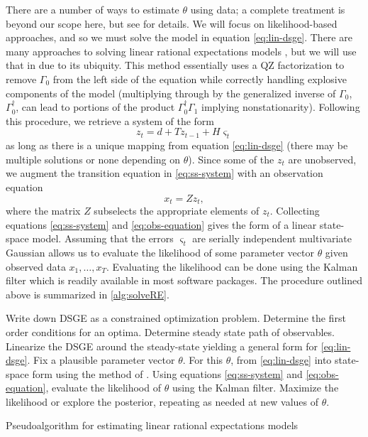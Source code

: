 \documentclass[11pt]{article}
\begin{document}
There are a number of ways to estimate \(\theta\) using data; a complete
treatment is beyond our scope here, but see \citet{DeJongDave2007} for
details. We will focus on likelihood-based approaches, and so we must
solve the model in equation \eqref{eq:lin-dsge}. There are many
approaches to solving linear rational expectations models
\citep[e.g.][]{BlanchardKahn1980,Klein2000}, but we will use that in
\citet{Sims2002} due to its ubiquity. This method essentially uses a QZ
factorization to remove \(\Gamma_0\) from the left side of the equation
while correctly handling explosive components of the model (multiplying
through by the generalized inverse of \(\Gamma_0\),
\(\Gamma_0^\dagger\), can lead to portions of the product
\(\Gamma_0^\dagger \Gamma_1\) implying nonstationarity). Following this
procedure, we retrieve a system of the form \begin{equation}
  \label{eq:ss-system}
  z_t = d + T z_{t-1} + H \varsigma_t
\end{equation} as long as there is a unique mapping from equation
\eqref{eq:lin-dsge} (there may be multiple solutions or none depending
on \(\theta\)). Since some of the \(z_t\) are unobserved, we augment the
transition equation in \eqref{eq:ss-system} with an observation equation
\begin{equation}
  \label{eq:obs-equation}
  x_t = Z z_t,
\end{equation} where the matrix \(Z\) subselects the appropriate
elements of \(z_t\). Collecting equations \eqref{eq:ss-system} and
\eqref{eq:obs-equation} gives the form of a linear state-space model.
Assuming that the errors \(\varsigma_t\) are serially independent
multivariate Gaussian allows us to evaluate the likelihood of some
parameter vector \(\theta\) given observed data \(x_1,\ldots,x_T\).
Evaluating the likelihood can be done using the Kalman filter
\citep{Kalman1960} which is readily available in most software packages.
The procedure outlined above is summarized in \autoref{alg:solveRE}.

\begin{algorithm}[t]
\begin{algorithmic}[1]
  \State Write down DSGE as a constrained optimization problem.
  \State Determine the first order conditions for an optima.
  \State Determine steady state path of observables.
  \State Linearize the DSGE around the steady-state yielding a general
    form for \eqref{eq:lin-dsge}.
    \State Fix a plausible parameter vector $\theta$.
    \State For this $\theta$, from \eqref{eq:lin-dsge} into state-space form
      using the method of \citep{Sims2002}.
    \State Using equations \eqref{eq:ss-system} and \eqref{eq:obs-equation}, evaluate the
      likelihood of $\theta$ using the Kalman filter.
    \State Maximize the likelihood or explore the posterior, repeating
      as needed at new values of $\theta$.
    \EndProcedure
  \end{algorithmic}
  \caption{Pseudoalgorithm for estimating linear rational expectations models}
  \label{alg:solveRE}
\end{algorithm}
\end{document}
